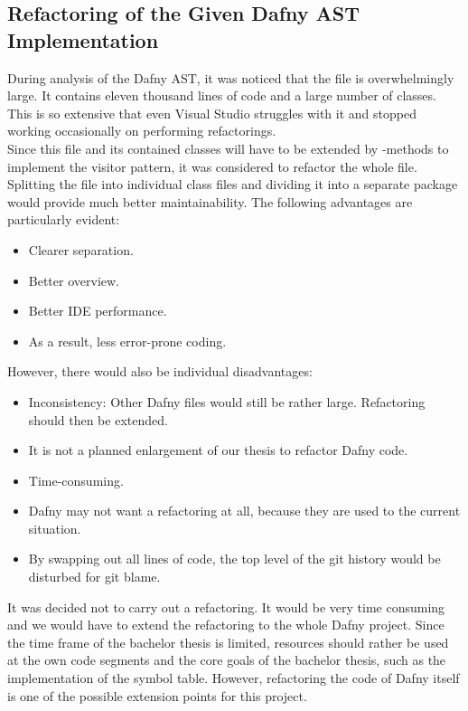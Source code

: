 \subsection{Refactoring of the Given Dafny AST Implementation}
During analysis of the Dafny AST, it was noticed that the file  is overwhelmingly large.
It contains eleven thousand lines of code and a large number of classes.
This is so extensive that even Visual Studio struggles with it and stopped working occasionally on performing refactorings.\\

Since this file and its contained classes will have to be extended by -methods
to implement the visitor pattern, it was considered to refactor the whole file.\\

Splitting the file into individual class files and dividing it into a separate package would provide much better maintainability.
The following advantages are particularly evident:
\begin{itemize}
    \item Clearer separation.
    \item Better overview.
    \item Better IDE performance.
    \item As a result, less error-prone coding.
\end{itemize}

However, there would also be individual disadvantages:
\begin{itemize}
    \item Inconsistency: Other Dafny files would still be rather large. Refactoring should then be extended.
    \item It is not a planned enlargement of our thesis to refactor Dafny code.
    \item Time-consuming.
    \item Dafny may not want a refactoring at all, because they are used to the current situation.
    \item By swapping out all lines of code, the top level of the git history would be disturbed for git blame.
\end{itemize}

It was decided not to carry out a refactoring.
It would be very time consuming and we would have to extend the refactoring to the whole Dafny project.
Since the time frame of the bachelor thesis is limited, resources should rather be used at the own code segments and the core goals of the bachelor thesis, such as the implementation of the symbol table.
However, refactoring the code of Dafny itself is one of the possible extension points for this project.

